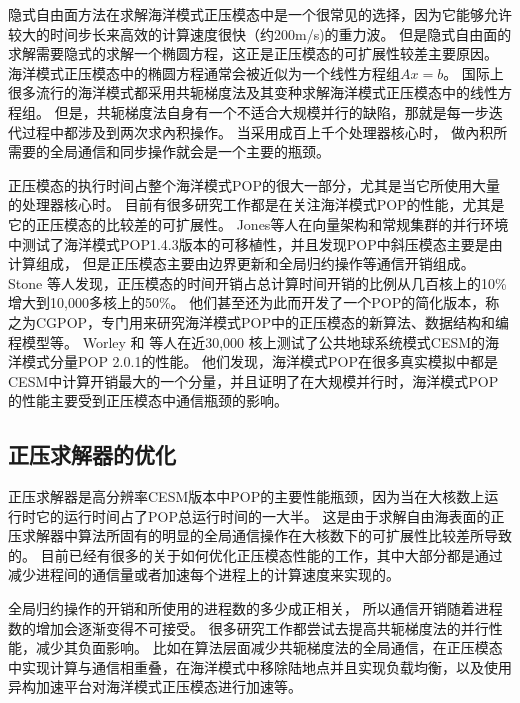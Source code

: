 隐式自由面方法在求解海洋模式正压模态中是一个很常见的选择，因为它能够允许较大的时间步长来高效的计算速度很快（约200m/s)的重力波。
但是隐式自由面的求解需要隐式的求解一个椭圆方程，这正是正压模态的可扩展性较差主要原因。 
海洋模式正压模态中的椭圆方程通常会被近似为一个线性方程组$Ax=b$。 
国际上很多流行的海洋模式都采用共轭梯度法及其变种求解海洋模式正压模态中的线性方程组\citep{adcroft2014mitgcm,lai2010nonhydrostatic,madec1997ocean}。
但是，共轭梯度法自身有一个不适合大规模并行的缺陷，那就是每一步迭代过程中都涉及到两次求內积操作。 
当采用成百上千个处理器核心时， 做內积所需要的全局通信和同步操作就会是一个主要的瓶颈。

正压模态的执行时间占整个海洋模式POP的很大一部分，尤其是当它所使用大量的处理器核心时。
目前有很多研究工作都是在关注海洋模式POP的性能，尤其是它的正压模态的比较差的可扩展性。 
Jones\cite{pop05}等人在向量架构和常规集群的并行环境中测试了海洋模式POP1.4.3版本的可移植性，并且发现POP中斜压模态主要是由计算组成， 但是正压模态主要由边界更新和全局归约操作等通信开销组成。
Stone  \cite{stone2011cgpop}等人发现，正压模态的时间开销占总计算时间开销的比例从几百核上的10\%增大到10,000多核上的50\%。 
他们甚至还为此而开发了一个POP的简化版本，称之为CGPOP，专门用来研究海洋模式POP中的正压模态的新算法、数据结构和编程模型等。 
Worley  \cite{Worley:2011:PCE:2063384.2063457} 和 \cite{dennis2012computational} 等人在近30,000 核上测试了公共地球系统模式CESM的海洋模式分量POP 2.0.1的性能。 
他们发现，海洋模式POP在很多真实模拟中都是CESM中计算开销最大的一个分量，并且证明了在大规模并行时，海洋模式POP的性能主要受到正压模态中通信瓶颈的影响。 

\subsection{正压求解器的优化}
\label{related:improve}


正压求解器是高分辨率CESM版本中POP的主要性能瓶颈，因为当在大核数上运行时它的运行时间占了POP总运行时间的一大半。 
这是由于求解自由海表面的正压求解器中算法所固有的明显的全局通信操作在大核数下的可扩展性比较差所导致的。
目前已经有很多的关于如何优化正压模态性能的工作，其中大部分都是通过减少进程间的通信量或者加速每个进程上的计算速度来实现的。 

全局归约操作的开销和所使用的进程数的多少成正相关， 所以通信开销随着进程数的增加会逐渐变得不可接受。
很多研究工作都尝试去提高共轭梯度法的并行性能，减少其负面影响。 
比如在算法层面减少共轭梯度法的全局通信\cite{dAzevedo1999lapack}，在正压模态中实现计算与通信相重叠\cite{beare1997optimisation}，在海洋模式中移除陆地点并且实现负载均衡\cite{dennis2007inverse, dennis2008scaling}，以及使用异构加速平台对海洋模式正压模态进行加速等。

